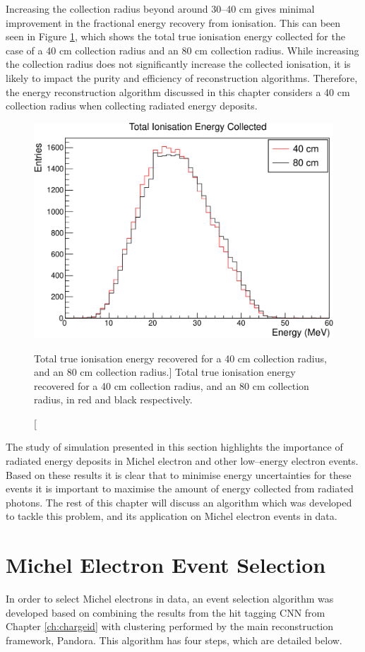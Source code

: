 Increasing the collection radius beyond around 30--40 cm gives minimal
improvement in the fractional energy recovery from ionisation. This can been
seen in Figure \ref{fig:40_v_80}, which shows the total true ionisation energy
collected for the case of a 40 cm collection radius and an 80 cm collection
radius. While increasing the collection radius does not significantly increase
the collected ionisation, it is likely to impact the purity and efficiency of
reconstruction algorithms. Therefore, the energy reconstruction algorithm
discussed in this chapter considers a 40 cm collection radius when collecting
radiated energy deposits.
\begin{figure}
	\centering
	\includegraphics[width=\textwidth]{figures/40_v_80.pdf}
	\caption
	[Total true ionisation energy recovered for a 40 cm collection radius, and an
	80 cm collection radius.]
	{Total true ionisation energy recovered for a 40 cm collection radius, and an
	80 cm collection radius, in red and black respectively.}
	\label{fig:40_v_80}
\end{figure}

The study of \protodune{} simulation presented in this section highlights the 
importance of radiated energy deposits in Michel electron and other 
low--energy electron events. Based on these results it is clear that to 
minimise energy uncertainties for these events it is important to maximise the 
amount of energy collected from radiated photons. The rest of this chapter 
will discuss an algorithm which was developed to tackle this problem, and its 
application on Michel electron events in \protodune{} data.

\section{Michel Electron Event Selection} \label{ME_ES}
In order to select Michel electrons in \protodune{} data, an event selection
algorithm was developed based on combining the results from the hit tagging CNN
from Chapter \ref{ch:chargeid} with clustering performed by the main
\protodune{} reconstruction framework, Pandora. This algorithm has four steps,
which are detailed below.

